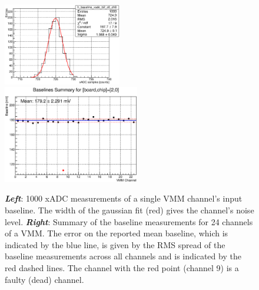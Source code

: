 \begin{figure}[!htb]
    \begin{center}
        \includegraphics[width=0.46\textwidth]{figures/nsw/calibration/xadc_calib_channel_baseline_samples}
        \includegraphics[width=0.53\textwidth]{figures/nsw/calibration/calib_baselines_vmm_summary}
        \caption{
            \textbf{\textit{Left}}: 1000 xADC measurements of a single VMM channel's input baseline.
                The width of the gaussian fit (red) gives the channel's noise level.
            \textbf{\textit{Right}}: Summary of the baseline measurements for 24 channels of a VMM.
                The error on the reported mean baseline, which is indicated by the blue line, is given by the RMS spread of the baseline measurements
                across all channels and is indicated by the red dashed lines.
                The channel with the red point (channel 9) is a faulty (dead) channel.
        }
        \label{fig:baselines_calib}
    \end{center}
\end{figure}

